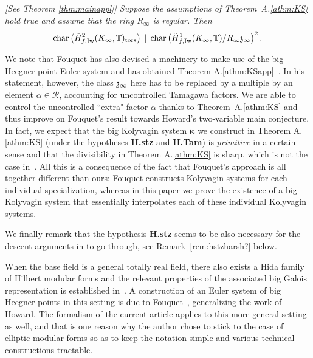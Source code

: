 \documentclass[12pt]{amsart}
\numberwithin{equation}{section}
\newcounter{Athm}[section]\setcounter{Athm}{1}
\newenvironment{Athm}{\par\medskip\noindent\refstepcounter{Athm}
\bgroup{\hspace*{-0.15 cm}\bf{Theorem}
A.{\arabic{Athm}}.}\bgroup\it}{\egroup \egroup\par\medskip}
\begin{document}
\begin{Athm}\textup{[See Theorem \ref{thm:mainappl}]}
\label{athm:KSapp} Suppose  the assumptions of Theorem~A.\ref{athm:KS} hold true and assume that the ring $R_\infty$ is regular. Then 
$$\textup{char}\left(\tilde{H}^2_{f,\textup{Iw}}(K_\infty, {\mathbb{T}})_{\textup{tors}}\right)\,\mid \, \textup{char}\left(\tilde{H}^1_{f,\textup{Iw}}(K_\infty, {\mathbb{T}})/R_\infty\frak{z}_\infty\right)^2.$$
\end{Athm}

We note that Fouquet has also devised a machinery to
make use of the big Heegner point Euler system and has obtained Theorem A.\ref{athm:KSapp}~\cite[Theorem 2.9]{fouquetRIMS}. In his statement, however, the class $\frak{z}_\infty$ here has to be replaced by a multiple by an element $\alpha \in {\mathcal{R}}$, accounting for uncontrolled Tamagawa factors. We are able to control the uncontrolled ``extra" factor $\alpha$ thanks to Theorem~A.\ref{athm:KS} and thus
improve on Fouquet's result towards Howard's two-variable main
conjecture.  In fact, we expect that the big Kolyvagin system $\pmb{\kappa}$ we construct in Theorem A.\ref{athm:KS} (under the hypotheses \textbf{H.stz} and  \textbf{H.Tam}) is \emph{primitive} in a certain sense and that the divisibility in Theorem A.\ref{athm:KS} is sharp, which is not the case in~\cite{fouquetRIMS}. All this is a consequence of the fact that Fouquet's approach is all
together different than ours: Fouquet constructs Kolyvagin systems
for each individual specialization, whereas in this paper we prove
the existence of a big Kolyvagin system that essentially
interpolates each of these individual Kolyvagin systems. 

We finally remark that the hypothesis \textbf{H.stz} seems to be also necessary for the descent arguments in \cite{fouquetRIMS} to go through, see Remark~\ref{rem:hstzharsh?} below.

When the base field is a general totally real field, there also
exists a Hida family of Hilbert modular forms and the relevant
properties of the associated big Galois representation is
established in~\cite{hidaannals88, hida89algana, SW99, SW01}. A
construction of an Euler system of big Heegner points in this
setting is due to Fouquet~\cite{fouquetthesis}, generalizing the
work of Howard. The formalism of the current article applies to this more general setting as well, and that is one
reason why the author chose to stick to the case of elliptic modular
forms so as to keep the notation simple and various technical
constructions tractable.
\end{document}
